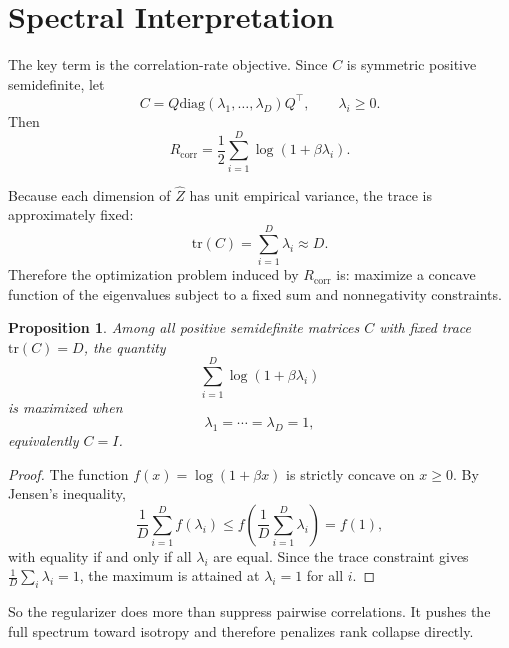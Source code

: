 \documentclass[11pt]{article}
\newtheorem{proposition}{Proposition}
\newcommand{\tr}{\mathrm{tr}}
\newcommand{\diag}{\mathrm{diag}}
\begin{document}
\section{Spectral Interpretation}

The key term is the correlation-rate objective. Since $C$ is symmetric positive semidefinite, let
\begin{equation}
    C = Q \diag(\lambda_1, \dots, \lambda_D) Q^{\top},
    \qquad
    \lambda_i \ge 0.
\end{equation}
Then
\begin{equation}
    R_{\mathrm{corr}}
    =
    \frac{1}{2}
    \sum_{i=1}^{D} \log(1 + \beta \lambda_i).
\end{equation}

Because each dimension of $\widehat{Z}$ has unit empirical variance, the trace is approximately fixed:
\begin{equation}
    \tr(C)
    =
    \sum_{i=1}^{D} \lambda_i
    \approx D.
\end{equation}
Therefore the optimization problem induced by $R_{\mathrm{corr}}$ is: maximize a concave function of the eigenvalues subject to a fixed sum and nonnegativity constraints.

\begin{proposition}
Among all positive semidefinite matrices $C$ with fixed trace $\tr(C)=D$, the quantity
\begin{equation}
    \sum_{i=1}^{D} \log(1 + \beta \lambda_i)
\end{equation}
is maximized when
\begin{equation}
    \lambda_1 = \cdots = \lambda_D = 1,
\end{equation}
equivalently $C = I$.
\end{proposition}

\begin{proof}
The function $f(x)=\log(1+\beta x)$ is strictly concave on $x \ge 0$. By Jensen's inequality,
\begin{equation}
    \frac{1}{D}\sum_{i=1}^{D} f(\lambda_i)
    \le
    f\left(
        \frac{1}{D}\sum_{i=1}^{D}\lambda_i
    \right)
    =
    f(1),
\end{equation}
with equality if and only if all $\lambda_i$ are equal. Since the trace constraint gives $\frac{1}{D}\sum_i \lambda_i = 1$, the maximum is attained at $\lambda_i = 1$ for all $i$.
\end{proof}

So the regularizer does more than suppress pairwise correlations. It pushes the full spectrum toward isotropy and therefore penalizes rank collapse directly.
\end{document}
